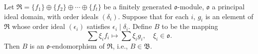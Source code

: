 Let $\mathfrak{R} = \{f_1\} \oplus \{f_2\} \oplus \cdots \oplus \{f_t\}$ be a finitely generated $\mathfrak{o}$-module, $\mathfrak{o}$ a principal ideal domain, with order ideals $(\delta_i)$. Suppose that for each $i$, $g_i$ is an element of $\mathfrak{R}$ whose order ideal $(\epsilon_i)$ satisfies $\epsilon_i \mid \delta_i$. Define $B$ to be the mapping
$$\sum \xi_i f_i \mapsto \sum \xi_i g_i, \quad \xi_i \in \mathfrak{o}.$$
Then $B$ is an $\mathfrak{o}$-endomorphism of $\mathfrak{R}$, i.e., $B \in \mathfrak{B}$.
